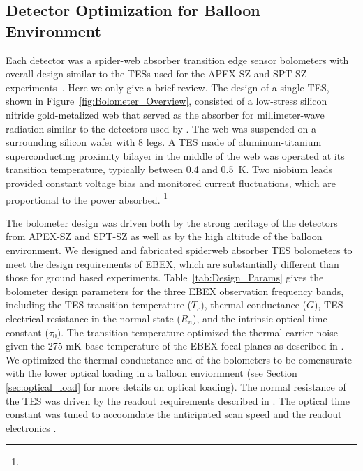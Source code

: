 \documentclass[../EBEXPaper2.tex]{subfiles}
\begin{document}
\subsection{Detector Optimization for Balloon Environment}
\label{sec:detector_optimization}

Each detector was a spider-web absorber 
transition edge sensor bolometers with overall design similar to the \ac{TES}s used for the 
APEX-SZ and SPT-SZ experiments~\citep{Westbrook_2012, Westbrook_thesis, Chang_2009, Schwan_2010, Lee_1996}. Here 
we only give a brief review.  The design of a single 
\ac{TES}, shown in Figure~\ref{fig:Bolometer_Overview}, consisted of a low-stress silicon nitride gold-metalized web that served as the absorber for millimeter-wave radiation similar to the detectors used by \planck. 
The web was suspended on a surrounding silicon wafer with 8 legs. 
A \ac{TES} made of aluminum-titanium superconducting proximity bilayer in the middle of the web was operated at its transition 
temperature, typically between 0.4 and 0.5~K. Two niobium leads provided constant voltage bias and monitored current fluctuations, 
which are proportional to the power absorbed.  \footnote{ }

 The bolometer design was driven both by the strong heritage of the detectors from APEX-SZ and SPT-SZ as well as by the high altitude of the balloon environment. We designed and fabricated spiderweb absorber \ac{TES} bolometers to meet the design requirements of \ac{EBEX}, which are substantially different than those for ground based experiments. Table~\ref{tab:Design_Params} gives the bolometer design parameters for the three \ac{EBEX} observation frequency bands, including the \ac{TES} transition temperature ($T_c$),  thermal conductance ($G$), \ac{TES} electrical resistance in the normal state ($R_n$), and the intrinsic optical time constant ($\tau_0$).  The transition temperature optimized the thermal carrier noise given the 275 mK base temperature of the EBEX focal planes as described in \cite{Westbrook_thesis}.  We optimized the thermal conductance and of the bolometers to be comensurate with the lower optical loading in a balloon enviornment (see Section \ref{sec:optical_load} for more details on optical loading).  The normal resistance of the \ac{TES} was driven by the readout requirements described in \citet{dobbs_revSciInst_2012}.   The optical time constant was tuned to accoomdate the anticipated scan speed and the readout electronics \citep{dobbs_revSciInst_2012, Westbrook_thesis}.
\end{document}
